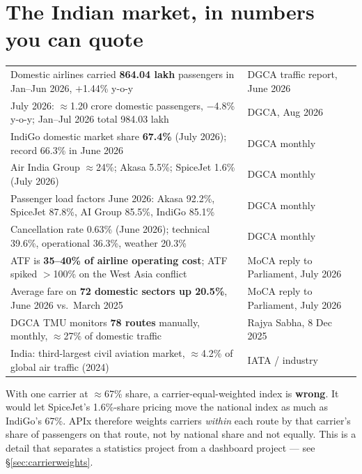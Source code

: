 \section{The Indian market, in numbers you can quote}

\begin{center}
\small
\begin{tabularx}{\textwidth}{@{}L{7.2cm} X@{}}
\toprule
{} &  \\
\midrule
Domestic airlines carried \textbf{864.04 lakh} passengers in Jan--Jun 2026, $+$1.44\% y-o-y & DGCA traffic report, June 2026 \\
July 2026: $\approx$1.20 crore domestic passengers, $-$4.8\% y-o-y; Jan--Jul 2026 total 984.03 lakh & DGCA, Aug 2026 \\
IndiGo domestic market share \textbf{67.4\%} (July 2026); record 66.3\% in June 2026 & DGCA monthly \\
Air India Group $\approx$24\%; Akasa 5.5\%; SpiceJet 1.6\% (July 2026) & DGCA monthly \\
Passenger load factors June 2026: Akasa 92.2\%, SpiceJet 87.8\%, AI Group 85.5\%, IndiGo 85.1\% & DGCA monthly \\
Cancellation rate 0.63\% (June 2026); technical 39.6\%, operational 36.3\%, weather 20.3\% & DGCA monthly \\
ATF is \textbf{35--40\% of airline operating cost}; ATF spiked $>$100\% on the West Asia conflict & MoCA reply to Parliament, July 2026 \\
Average fare on \textbf{72 domestic sectors up 20.5\%}, June 2026 vs.\ March 2025 & MoCA reply to Parliament, July 2026 \\
DGCA TMU monitors \textbf{78 routes} manually, monthly, $\approx$27\% of domestic traffic & Rajya Sabha, 8 Dec 2025 \\
India: third-largest civil aviation market, $\approx$4.2\% of global air traffic (2024) & IATA / industry \\
\bottomrule
\end{tabularx}
\end{center}

\begin{warnbox}
 With one carrier at $\approx$67\%
share, a carrier-equal-weighted index is \textbf{wrong}. It would let SpiceJet's 1.6\%-share
pricing move the national index as much as IndiGo's 67\%. APIx therefore weights carriers
\emph{within} each route by that carrier's share of passengers on that route, not by
national share and not equally. This is a detail that separates a statistics project from
a dashboard project --- see \S\ref{sec:carrierweights}.
\end{warnbox}

